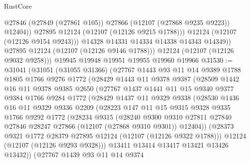 \begin{lexlean}{RustCore}
\begin{coremodule}
                    @27846
                    (@27849 (@27861 @105))
                    @27866
                    (@12107 (@27868 @9235 @9223))
                    @12404))
                @27895
                @12124
                (@12107 (@12126 @9215 @1788)))
              @12124
              (@12107 (@12126 @9154 @9243)))
            @14328
            @14331
            @14334
            @14338
            @14343
            @14349))
        @27895
        @12124
        (@12107 (@12126 @9146 @1788)))
      @12124
      (@12107 (@12126 @9032 @9258)))
    @19945
    @19948
    @19951
    @19955
    @19960
    @19966
@31530 := @31041
    (@31051
      (@31055 @31366)
      (@27767
        @1443
        @93
        @11
        @14
        @9389
        @1788
        @1805
        @1766
        @9276
        @1772
        (@28429
          @1443
          @11
          @9378
          @9387
          (@28509
            @1442
            @16
            @11
            @9378
            @9385
            @2650
            (@27767
              @1437
              @1441
              @11
              @15
              @9340
              @9377
              @9384
              @1766
              @9284
              @1772
              (@28429
                @1437
                @11
                @9329
                @9338
                (@28530
                  @1436
                  @16
                  @11
                  @9329
                  @9336
                  @2209
                  (@28223
                    @147
                    @11
                    @15
                    @9315
                    @9328
                    @9335
                    @1766
                    @9292
                    @1772
                    (@28234
                      @9315
                      (@28240
                        @9300
                        @9310
                        @27811
                        @27840
                        @27846
                        @28247
                        @27866
                        (@12107 (@27868 @9310 @9301))
                        @12404))
                    (@28373 @9321 @1772 @28379 @27895 @12124 (@12107 (@12126 @9322 @1788)))
                    @12124
                    (@12107 (@12126 @9293 @9328)))
                  @13411
                  @13414
                  @13417
                  @13421
                  @13426
                  @13432))
              (@27767
                @1439
                @93
                @11
                @14
                @9374

\end{coremodule}
\end{lexlean}
